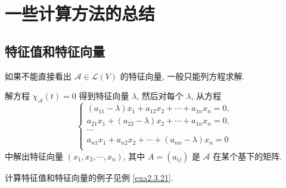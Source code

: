 \documentclass[color=black,device=normal,lang=cn,mode=geye]{elegantnote}
\begin{document}
\section{一些计算方法的总结}
\subsection{特征值和特征向量}
如果不能直接看出 $\mathcal{A}\in\mathcal{L}(V)$ 的特征向量, 一般只能列方程求解.

解方程 $\chi_\mathcal{A}(t)=0$ 得到特征向量 $\lambda$, 然后对每个 $\lambda$, 从方程
\[\begin{cases}
    (a_{11}-\lambda)x_1+a_{12}x_2+\cdots+a_{1n}x_n=0, \\
    a_{21}x_1+(a_{22}-\lambda)x_2+\cdots+a_{1n}x_n=0, \\
    \cdots \\
    a_{n1}x_1+a_{n2}x_2+\cdots+(a_{nn}-\lambda)x_n=0 \\
\end{cases}\]
中解出特征向量 $(x_1,x_2,\cdots,x_n)$, 其中 $A=(a_{ij})$ 是 $\mathcal{A}$ 在某个基下的矩阵.

计算特征值和特征向量的例子见例 \ref{exa2.3.21}.
\end{document}
